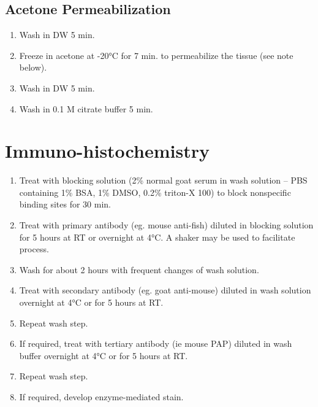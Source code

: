 \documentclass[
  letterpaper,
  DIV=11,
  numbers=noendperiod]{scrreprt}
\providecommand{\tightlist}{%
  \setlength{\itemsep}{0pt}\setlength{\parskip}{0pt}}\usepackage{longtable,booktabs,array}
\begin{document}
\hypertarget{acetone-permeabilization}{%
\subsection{Acetone Permeabilization}\label{acetone-permeabilization}}

\begin{enumerate}
\def\labelenumi{\arabic{enumi}.}
\setcounter{enumi}{4}
\tightlist
\item
  Wash in DW 5 min.
\item
  Freeze in acetone at -20°C for 7 min. to permeabilize the tissue (see
  note below).
\item
  Wash in DW 5 min.
\item
  Wash in 0.1 M citrate buffer 5 min.
\end{enumerate}

\hypertarget{immuno-histochemistry}{%
\section{Immuno-histochemistry}\label{immuno-histochemistry}}

\begin{enumerate}
\def\labelenumi{\arabic{enumi}.}
\setcounter{enumi}{8}
\tightlist
\item
  Treat with blocking solution (2\% normal goat serum in wash solution
  -- PBS containing 1\% BSA, 1\% DMSO, 0.2\% triton-X 100) to block
  nonspecific binding sites for 30 min.
\item
  Treat with primary antibody (eg. mouse anti-fish) diluted in blocking
  solution for 5 hours at RT or overnight at 4°C. A shaker may be used
  to facilitate process.
\item
  Wash for about 2 hours with frequent changes of wash solution.
\item
  Treat with secondary antibody (eg. goat anti-mouse) diluted in wash
  solution overnight at 4°C or for 5 hours at RT.
\item
  Repeat wash step.
\item
  If required, treat with tertiary antibody (ie mouse PAP) diluted in
  wash buffer overnight at 4°C or for 5 hours at RT.
\item
  Repeat wash step.
\item
  If required, develop enzyme-mediated stain.
\end{enumerate}
\end{document}
